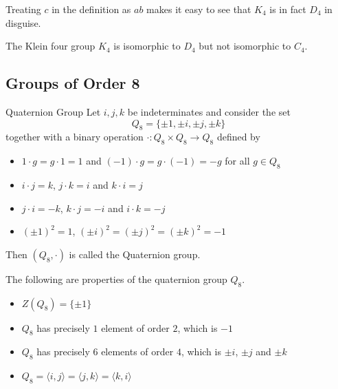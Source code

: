 \documentclass[a4paper]{article}
\begin{document}
Treating $c$ in the definition as $ab$ makes it easy to see that $K_4$ is in fact $D_4$ in disguise. 

\begin{lmm}{}{} The Klein four group $K_4$ is isomorphic to $D_4$ but not isomorphic to $C_4$. 
\end{lmm}

\subsection{Groups of Order 8}
\begin{defn}{Quaternion Group}{} Let $i,j,k$ be indeterminates and consider the set $$Q_8=\{\pm1,\pm i,\pm j,\pm k\}$$ together with a binary operation $\cdot:Q_8\times Q_8\to Q_8$ defined by 
\begin{itemize}
\item $1\cdot g=g\cdot 1=1$ and $(-1)\cdot g=g\cdot(-1)=-g$ for all $g\in Q_8$
\item $i\cdot j=k$, $j\cdot k=i$ and $k\cdot i =j$
\item $j\cdot i=-k$, $k\cdot j=-i$ and $i\cdot k=-j$
\item $(\pm1)^2=1$, $(\pm i)^2=(\pm j)^2=(\pm k)^2=-1$
\end{itemize}
Then $(Q_8,\cdot)$ is called the Quaternion group. 
\end{defn}

\begin{prp}{}{} The following are properties of the quaternion group $Q_8$. 
\begin{itemize}
\item $Z(Q_8)=\{\pm 1\}$
\item $Q_8$ has precisely $1$ element of order $2$, which is $-1$
\item $Q_8$ has precisely $6$ elements of order $4$, which is $\pm i$, $\pm j$ and $\pm k$
\item $Q_8=\langle i,j\rangle=\langle j, k\rangle=\langle k, i\rangle$
\end{itemize}
\end{prp}
\end{document}
